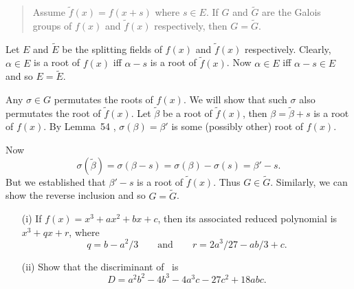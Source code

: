 \begin{myenumerate}
\begin{itemize}
 \begin{quotation}
 Assume \(\tilde{f}(x) = f(x+s)\) where \(s\in E\).
 If $G$ and \(\tilde{G}\) are the Galois groups
 of \(f(x)\) and \(\tilde{f}(x)\)  respectively,
 then \(G = \tilde{G}\).
 \end{quotation}

 Let $E$ and \(\tilde{E}\) be the splitting fields of
 \(f(x)\) and \(\tilde{f}(x)\)  respectively. Clearly, \(\alpha\in E\)
 is a root of \(f(x)\) iff \(\alpha - s\) is a root of \(\tilde{f}(x)\).
 Now \(\alpha \in E\) iff \(\alpha - s \in E\) and so \(E = \tilde{E}\).

 Any \(\sigma\in G\) permutates the roots of \(f(x)\).
 We will show that such \(\sigma\)
 also permutates the root of \(\tilde{f}(x)\).
 Let \(\tilde{\beta}\) be a root of \(\tilde{f}(x)\),
 then \(\beta=\tilde{\beta}+s\)
 is a root  of \(f(x)\). By Lemma~54 \cite{Rotman98},
 \(\sigma(\beta)=\beta'\)
 is some (possibly other) root of \(f(x)\).

 Now
 \begin{equation*}
 \sigma(\tilde{\beta})
   =  \sigma(\beta - s)  =  \sigma(\beta) - \sigma(s)  =  \beta' - s.
 \end{equation*}
 But we established that \(\beta' - s\) is a root of \(\tilde{f}(x)\).
 Thus \(G\in \tilde{G}\). Similarly, we can show the reverse inclusion
 and so \(G = \tilde{G}\).

\end{itemize}

\item\label{ex:det:cubic}%
\begin{excopy}
\begin{itemize}
 \item[(i)]
   If \(f(x) = x^3 + ax^2 + bx + c\), then its associated reduced polynomial
   is \(x^3+qx+r\), where
   \begin{equation*}
     q =  b - a^2/3 \qquad \textrm{and} \qquad r = 2a^3/27 - ab/3 + c.
   \end{equation*}
 \item[(ii)]
   Show that the discriminant of \fx\ is
   \begin{equation*}
     D = a^2b^2 - 4b^3 - 4a^3c - 27c^2 + 18abc.
   \end{equation*}
\end{itemize}
\end{excopy}


\end{myenumerate}
